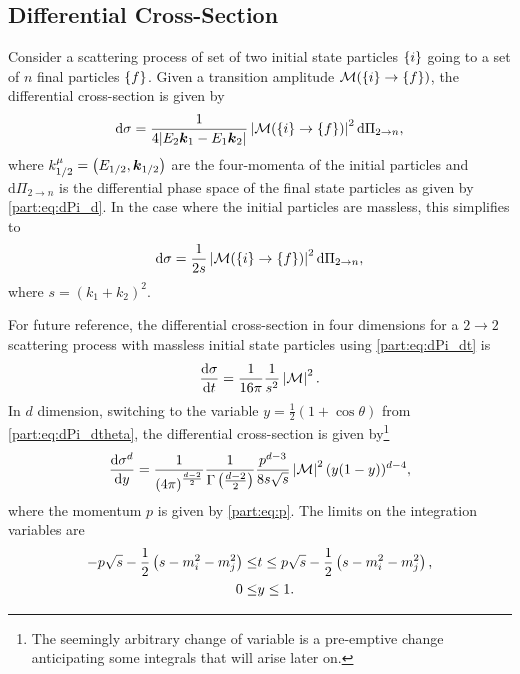 \documentclass[../main.tex]{subfiles}
\begin{document}
\subsection{Differential Cross-Section}
Consider a scattering process of set of two initial state particles \(\cclosed{i}\) going to a set of \(n\) final particles \(\cclosed{f}\).
Given a transition amplitude \(\M(\cclosed{i} \to \cclosed{f})\), the differential cross-section is given by~\cite{Schwartz:2014sze}
\begin{equation}
  \mathrm{d}\sigma = \frac{1}{4|E_2 \vec{k}_1 - E_1\vec{k}_2|} \abs{\M(\cclosed{i} \to \cclosed{f})}^2 \mathrm{d}\Pi_{2 \to n},
\end{equation}
where \(k_{1/2}^\mu = \pclosed{E_{1/2}, \vec{k}_{1/2}}\) are the four-momenta of the initial particles and \(\mathrm{d}\Pi_{2 \to n}\) is the differential phase space of the final state particles as given by \cref{part:eq:dPi_d}.
In the case where the initial particles are massless, this simplifies to
\begin{equation}
  \label{part:eq:diff_xsec_formula}
  \mathrm{d}\sigma = \frac{1}{2s} \abs{\M(\cclosed{i} \to \cclosed{f})}^2 \mathrm{d}\Pi_{2 \to n},
\end{equation}
where \(s = (k_1 + k_2)^2\).

For future reference, the differential cross-section in four dimensions for a \(2\to 2\) scattering process with massless initial state particles using \cref{part:eq:dPi_dt} is
\begin{equation}
  \d[t]{\sigma} = \frac{1}{16\pi} \frac{1}{s^2} \abs{\M}^2.
\end{equation}
In \(d\) dimension, switching to the variable \(y = \frac{1}{2}(1+\cos\theta)\) from \cref{part:eq:dPi_dtheta}, the differential cross-section is given by\footnote{The seemingly arbitrary change of variable is a pre-emptive change anticipating some integrals that will arise later on.}
\begin{equation}
  \d[y]{\sigma^d} = \frac{1}{\pclosed{4\pi}^{\frac{d-2}{2}}} \frac{1}{\Gamma\pclosed{\frac{d-2}{2}}} \frac{p^{d-3}}{8s\sqrt{s}} \abs{\M}^2 (y(1-y))^{d-4},
\end{equation}
where the momentum \(p\) is given by \cref{part:eq:p}.
The limits on the integration variables are
\begin{subequations}
  \begin{align}
    -p\sqrt{s} - \frac{1}{2}\pclosed{s - m_i^2 - m_j^2} \leq & t \leq p\sqrt{s} - \frac{1}{2}\pclosed{s - m_i^2 - m_j^2}, \\
    0 \leq                                                   & y \leq 1.
  \end{align}
\end{subequations}
\end{document}
